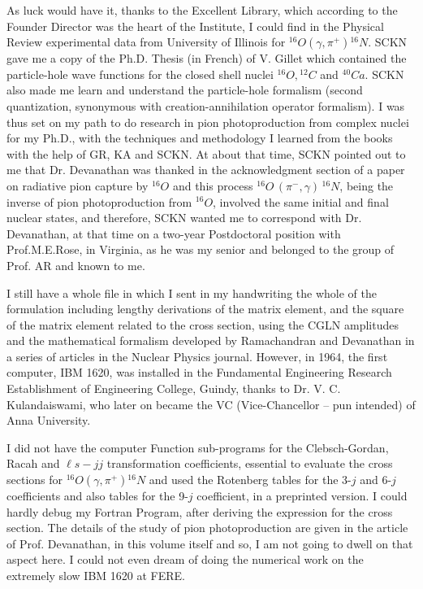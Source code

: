 As luck would have it, thanks to the Excellent Library, which according to the Founder Director was the heart of the Institute, I could find in the Physical Review experimental data from University of Illinois for ${}^{16}O(\gamma, \pi^+){}^{16}N$. SCKN gave me a copy of the Ph.D. Thesis (in French) of V. Gillet which contained the particle-hole wave functions for the closed shell nuclei ${}^{16}O, {}^{12}C$ and ${}^{40}Ca$. SCKN also made me learn and understand the particle-hole formalism (second quantization, synonymous with creation-annihilation operator formalism). I was thus set on my path to do research in pion photoproduction from complex nuclei for my Ph.D., with the techniques and methodology I learned from the books with the help of GR, KA and SCKN. At about that time, SCKN pointed out to me that Dr. Devanathan was thanked in the acknowledgment section of a paper on radiative pion capture by $^{16}O$ and this process ${}^{16}O\,(\pi^- ,\gamma )\,{}^{16}N$, being the inverse of pion photoproduction from $^{16}O$, involved the same initial and final nuclear states, and therefore, SCKN wanted me to correspond with Dr. Devanathan, at that time on a two-year Postdoctoral position with Prof.M.E.Rose, in Virginia, as he was my senior and belonged to the group of Prof. AR and known to me.

I still have a whole file in which I sent in my handwriting the whole of the formulation including lengthy derivations of the matrix element, and the square of the matrix element related to the cross section, using the CGLN amplitudes and the mathematical formalism developed by Ramachandran and Devanathan in a series of articles in the Nuclear Physics journal. However, in 1964, the first computer, IBM 1620, was installed in the Fundamental Engineering Research Establishment of Engineering College, Guindy, thanks to Dr. V. C. Kulandaiswami, who later on became the VC (Vice-Chancellor -- pun intended) of Anna University.

I did not have the computer Function sub-programs for the Clebsch-Gordan, Racah and $\ell s-jj$ transformation coefficients, essential to evaluate the cross sections for ${}^{16}O(\gamma, \pi^+){}^{16}N$ and used the Rotenberg tables for the 3-$j$ and 6-$j$ coefficients and also tables for the 9-$j$ coefficient, in a preprinted version. I could hardly debug my Fortran Program, after deriving the expression for the cross section. The details of the study of pion photoproduction are given in the article of Prof. Devanathan, in this volume itself and so, I am not going to dwell on that aspect here. I could not even dream of doing the numerical work on the extremely slow IBM 1620 at FERE.

